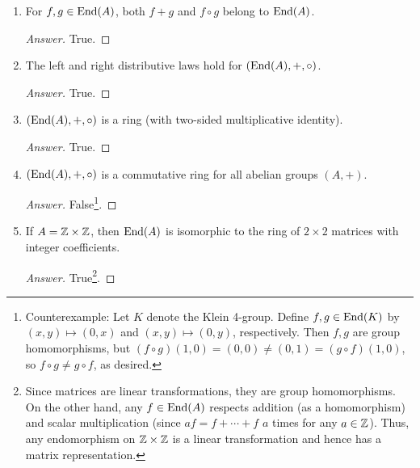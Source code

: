 \documentclass[../psets.tex]{subfiles}
\begin{document}
\begin{enumerate}[resume]
\begin{enumerate}[resume]
        \item For $f,g\in\operatorname{End}(A)$, both $f+g$ and $f\circ g$ belong to $\operatorname{End}(A)$.
        \begin{proof}[Answer]
            True.
        \end{proof}
        \item The left and right distributive laws hold for $(\operatorname{End}(A),+,\circ)$.
        \begin{proof}[Answer]
            True.
        \end{proof}
        \item $(\operatorname{End}(A),+,\circ)$ is a ring (with two-sided multiplicative identity).
        \begin{proof}[Answer]
            True.
        \end{proof}
        \item $(\operatorname{End}(A),+,\circ)$ is a commutative ring for all abelian groups $(A,+)$.
        \begin{proof}[Answer]
            False\footnote{Counterexample: Let $K$ denote the Klein 4-group. Define $f,g\in\operatorname{End}(K)$ by $(x,y)\mapsto(0,x)$ and $(x,y)\mapsto(0,y)$, respectively. Then $f,g$ are group homomorphisms, but $(f\circ g)(1,0)=(0,0)\neq(0,1)=(g\circ f)(1,0)$, so $f\circ g\neq g\circ f$, as desired.}.
        \end{proof}
        \item If $A=\mathbb{Z}\times\mathbb{Z}$, then $\operatorname{End}(A)$ is isomorphic to the ring of $2\times 2$ matrices with integer coefficients.
        \begin{proof}[Answer]
            True\footnote{Since matrices are linear transformations, they are group homomorphisms. On the other hand, any $f\in\operatorname{End}(A)$ respects addition (as a homomorphism) and scalar multiplication (since $af=f+\cdots+f$ $a$ times for any $a\in\mathbb{Z}$). Thus, any endomorphism on $\mathbb{Z}\times\mathbb{Z}$ is a linear transformation and hence has a matrix representation.}.
        \end{proof}
    \end{enumerate}
\end{enumerate}
\end{document}
